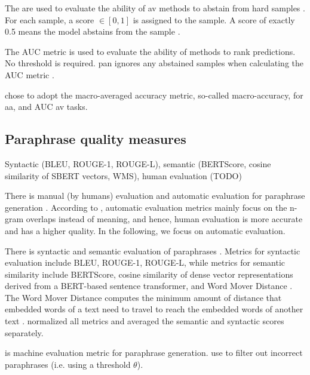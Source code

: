 The  are used to evaluate the ability of \ac{av} methods 
to abstain from hard samples \citep{tyo_state_2022}.
For each sample, a score $\in [0, 1]$ is assigned to the sample.
A score of exactly 0.5 means the model abstains from the sample \citep{tyo_state_2022,bevendorff_overview_2024,kocher_unine_2015}.

The AUC metric is used to evaluate the ability of methods to rank predictions.
No threshold is required.
\ac{pan} ignores any abstained samples when calculating the AUC metric \citep{tyo_state_2022}.

\citet{tyo_state_2022} chose to adopt the macro-averaged accuracy metric, so-called macro-accuracy, for \ac{aa}, 
and AUC \ac{av} tasks.

\subsection{Paraphrase quality measures}
\label{subsec:paraphrase_quality_measures}

Syntactic (BLEU, ROUGE-1, ROUGE-L), semantic (BERTScore, cosine similarity of SBERT vectors, WMS), human evaluation (TODO)

There is manual (by humans) evaluation and automatic evaluation for paraphrase generation \citep{fu_learning_2024,zhou_paraphrase_2021}.
According to \citet{zhou_paraphrase_2021}, automatic evaluation metrics mainly focus on the n-gram overlaps instead of meaning, 
and hence, human evaluation is more accurate and has a higher quality.
In the following, we focus on automatic evaluation.

There is syntactic and semantic evaluation of paraphrases \citep{gohsen_captions_2023}.
Metrics for syntactic evaluation include BLEU, ROUGE-1, ROUGE-L, 
while metrics for semantic similarity include BERTScore, 
cosine similarity of dense vector representations derived from a BERT-based sentence transformer, 
and Word Mover Distance \citep{gohsen_captions_2023}.
The Word Mover Distance computes the minimum amount of distance that embedded words of a text need to travel 
to reach the embedded words of another text \citep{gohsen_captions_2023}.
\citet{gohsen_captions_2023} normalized all metrics and averaged the semantic and syntactic scores separately.

\bluert{} is machine evaluation metric for paraphrase generation.
\citet{fu_learning_2024} use \bluert{} to filter out incorrect paraphrases (i.e. using a threshold $\theta$).

